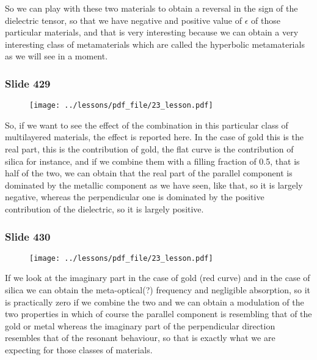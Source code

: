 \documentclass[../main/main.tex]{subfiles}
\begin{document}
So we can play with these two materials to obtain a reversal in the sign of the dielectric tensor, so that we have negative and positive value of $\epsilon$ of those particular materials, and that is very interesting because we can obtain a very interesting class of metamaterials which are called the hyperbolic metamaterials as we will see in a moment.

\newpage

\subsubsection{Slide 429}

\begin{figure}[h!]
\centering
\texttt{[image: ../lessons/pdf\_file/23\_lesson.pdf]}
\end{figure}

So, if we want to see the effect of the combination in this particular class of multilayered materials, the effect is reported here. In the case of gold this is the real part, this is the contribution of gold, the flat curve is the contribution of silica for instance, and if we combine them with a filling fraction of 0.5, that is half of the two, we can obtain that the real part of the parallel component is dominated by the metallic component as we have seen, like that, so it is largely negative, whereas the perpendicular one is dominated by the positive contribution of the dielectric, so it is largely positive.
 
 \newpage
 
\subsubsection{Slide 430}

\begin{figure}[h!]
\centering
\texttt{[image: ../lessons/pdf\_file/23\_lesson.pdf]}
\end{figure}

If we look at the imaginary part in the case of gold (red curve) and in the case of silica we can obtain the meta-optical(?) frequency and negligible absorption, so it is practically zero if we combine the two and we can obtain a modulation of the two properties in which of course the parallel component is resembling that of the gold or metal whereas the imaginary part of the perpendicular direction resembles that of the resonant behaviour, so that is exactly what we are expecting for those classes of materials.
\end{document}
